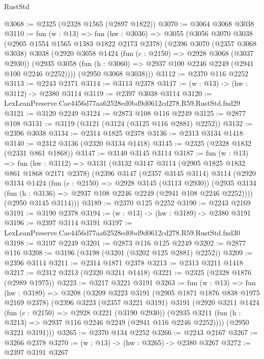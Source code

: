 \begin{lexlean}{RustStd}
\begin{coremodule}
@3068 := @2325 (@2328 @1565 (@2897 @1822))
@3070 := @3064 @3068 @3038
@3110 := fun (w : @13) =>
  fun (hw : @3036) =>
  @3055
    (@3056
      @3070
      @3038
      (@2905 @1554 @1565 @1383 @1822 @2173 @2378)
      (@2396
        @3070
        (@2357 @3068 @3038)
        @3038
        (@2920
          @3058
          @1424
          (fun (c : @2150) => @2928 @3068 (@3037 @2930))
          (@2935 @3058 (fun (h : @3060) => @2937 @100 @2246 @2249 (@2941 @100 @2246 @2252))))
        (@2950 @3068 @3038)))
@3112 := @2370 @116 @2252
@3113 := @2243 @2171
@3114 := @3113 @2378
@3117 := (w : @13) -> (hw : @3112) -> @2380 @3114
@3119 := @2397 @3038 @3114
@3120 := LexLeanPreserve.Cae4456d77aa62528ed0bd9d0612cd278.R59.RustStd.fnd29
@3121 := @3120 @2249
@3124 := @2873 @108 @116 @2249
@3125 := @2877 @108
@3131 := @3119 (@3121 (@3124 (@3125 @116 @2881) @2252))
@3132 := @2396 @3038
@3134 := @2314 @1825 @2378
@3136 := @2313 @3134 @1418
@3140 := @2312 @3136 (@2320 @3134 @1418)
@3145 := @2325 (@2328 @1832 (@2331 @861 @1868))
@3147 := @3140 @3145 @3114
@3187 := fun (w : @13) =>
  fun (hw : @3112) =>
  @3131
    (@3132
      @3147
      @3114
      (@2905 @1825 @1832 @861 @1868 @2171 @2378)
      (@2396
        @3147
        (@2357 @3145 @3114)
        @3114
        (@2920
          @3134
          @1424
          (fun (c : @2150) => @2928 @3145 (@3113 @2930))
          (@2935 @3134 (fun (h : @3136) => @2937 @108 @2246 @2249 (@2941 @108 @2246 @2252))))
        (@2950 @3145 @3114)))
@3189 := @2370 @125 @2252
@3190 := @2243 @2169
@3191 := @3190 @2378
@3194 := (w : @13) -> (hw : @3189) -> @2380 @3191
@3196 := @2397 @3114 @3191
@3197 := LexLeanPreserve.Cae4456d77aa62528ed0bd9d0612cd278.R59.RustStd.fnd30
@3198 := @3197 @2249
@3201 := @2873 @116 @125 @2249
@3202 := @2877 @116
@3208 := @3196 (@3198 (@3201 (@3202 @125 @2881) @2252))
@3209 := @2396 @3114
@3211 := @2314 @1871 @2378
@3213 := @2313 @3211 @1418
@3217 := @2312 @3213 (@2320 @3211 @1418)
@3221 := @2325 (@2328 @1876 (@2989 @1975))
@3223 := @3217 @3221 @3191
@3263 := fun (w : @13) =>
  fun (hw : @3189) =>
  @3208
    (@3209
      @3223
      @3191
      (@2905 @1871 @1876 @838 @1975 @2169 @2378)
      (@2396
        @3223
        (@2357 @3221 @3191)
        @3191
        (@2920
          @3211
          @1424
          (fun (c : @2150) => @2928 @3221 (@3190 @2930))
          (@2935 @3211 (fun (h : @3213) => @2937 @116 @2246 @2249 (@2941 @116 @2246 @2252))))
        (@2950 @3221 @3191)))
@3265 := @2370 @134 @2252
@3266 := @2243 @2167
@3267 := @3266 @2378
@3270 := (w : @13) -> (hw : @3265) -> @2380 @3267
@3272 := @2397 @3191 @3267

\end{coremodule}
\end{lexlean}
